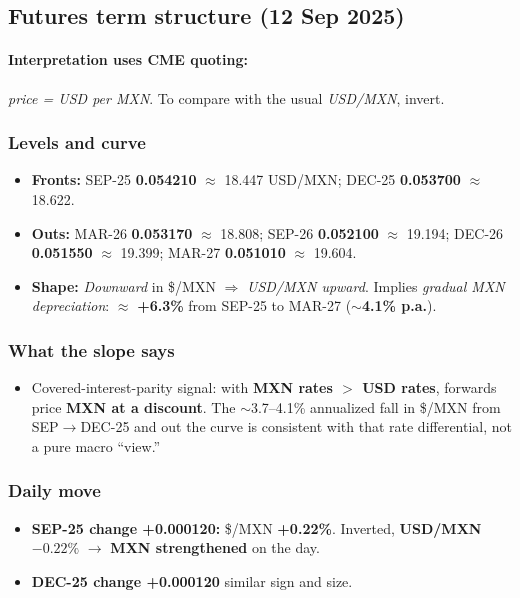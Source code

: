 \documentclass[10pt,a4paper]{article} %
\begin{document}
\subsection{Futures term structure (12 Sep 2025)}
\paragraph{Interpretation uses CME quoting:} \emph{price = USD per MXN}. To compare with the usual \emph{USD/MXN}, invert.

\subsubsection*{Levels and curve}
\begin{itemize}
  \item \textbf{Fronts:} SEP-25 \textbf{0.054210} $\approx$ 18.447 USD/MXN; DEC-25 \textbf{0.053700} $\approx$ 18.622.
  \item \textbf{Outs:} MAR-26 \textbf{0.053170} $\approx$ 18.808; SEP-26 \textbf{0.052100} $\approx$ 19.194; DEC-26 \textbf{0.051550} $\approx$ 19.399; MAR-27 \textbf{0.051010} $\approx$ 19.604.
  \item \textbf{Shape:} \emph{Downward} in \$/MXN $\Rightarrow$ \emph{USD/MXN upward}. Implies \emph{gradual MXN depreciation}: $\approx$ \textbf{+6.3\%} from SEP-25 to MAR-27 ($\sim$\textbf{4.1\% p.a.}).
\end{itemize}

\subsubsection*{What the slope says}
\begin{itemize}
  \item Covered-interest-parity signal: with \textbf{MXN rates $>$ USD rates}, forwards price \textbf{MXN at a discount}. The $\sim$3.7--4.1\% annualized fall in \$/MXN from SEP$\rightarrow$DEC-25 and out the curve is consistent with that rate differential, not a pure macro ``view.''
\end{itemize}

\subsubsection*{Daily move}
\begin{itemize}
  \item \textbf{SEP-25 change +0.000120:} \$/MXN \textbf{+0.22\%}. Inverted, \textbf{USD/MXN $-0.22\%$} $\rightarrow$ \textbf{MXN strengthened} on the day.
  \item \textbf{DEC-25 change +0.000120} similar sign and size.
\end{itemize}
\end{document}
